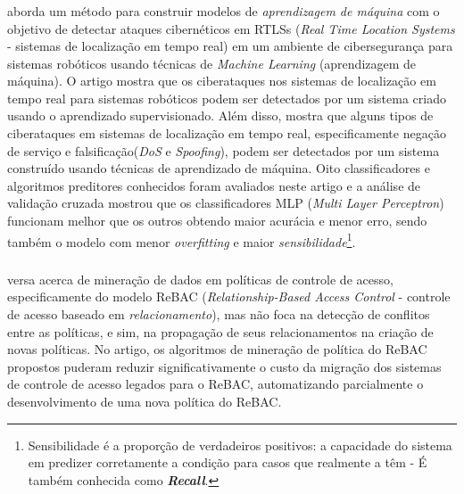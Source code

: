 \subsubsection{}
 aborda um método para construir modelos de \textit{aprendizagem de máquina} com o objetivo de detectar ataques cibernéticos em RTLSs (\textit{Real Time Location Systems} - sistemas de localização em tempo real) em um ambiente de cibersegurança para sistemas robóticos usando técnicas de \textit{Machine Learning} (aprendizagem de máquina).  O artigo mostra que os ciberataques nos sistemas de localização em tempo real para sistemas robóticos podem ser detectados por um sistema criado usando o aprendizado supervisionado. Além disso, mostra que alguns tipos de ciberataques em sistemas de localização em tempo real, especificamente negação de serviço e falsificação(\textit{DoS} e \textit{Spoofing}), podem ser detectados por um sistema construído usando técnicas de aprendizado de máquina. Oito classificadores e algoritmos preditores conhecidos foram avaliados neste artigo e a análise de validação cruzada mostrou que os classificadores MLP (\textit{Multi Layer Perceptron}) funcionam melhor que os outros obtendo maior acurácia e menor erro, sendo também o modelo com menor \textit{overfitting} e maior \textit{sensibilidade}\footnote{Sensibilidade é a proporção de verdadeiros positivos: a capacidade do sistema em predizer corretamente a condição para casos que realmente a têm - É também conhecida como \textit{\textbf{Recall}}.}. %

\subsubsection{}
 versa acerca de mineração de dados em políticas de controle de acesso, especificamente do modelo ReBAC (\textit{Relationship-Based Access Control} - controle de acesso baseado em \textit{relacionamento}), mas não foca na detecção de conflitos entre as políticas, e sim, na propagação de seus relacionamentos na criação de novas políticas. No artigo, os algoritmos de mineração de política do ReBAC propostos puderam reduzir significativamente o custo da migração dos sistemas de controle de acesso legados para o ReBAC, automatizando parcialmente o desenvolvimento de uma nova política do ReBAC.

